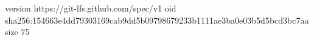 version https://git-lfs.github.com/spec/v1
oid sha256:154663e4dd79303169cab9dd5b09798679233b1111ae3ba0e03b5d5bcd3bc7aa
size 75
